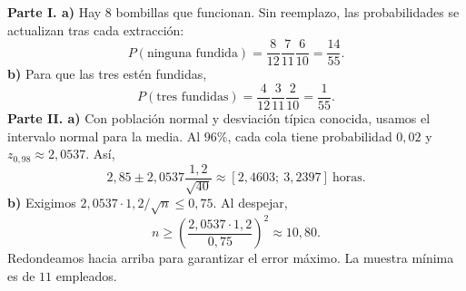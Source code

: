 \textbf{Parte I. a)} Hay 8 bombillas que funcionan. Sin reemplazo, las probabilidades se actualizan tras cada extracción:
\[
 P(\text{ninguna fundida})=\frac8{12}\frac7{11}\frac6{10}
 =\boxed{\frac{14}{55}}.
\]
\textbf{b)} Para que las tres estén fundidas,
\[
 P(\text{tres fundidas})=\frac4{12}\frac3{11}\frac2{10}
 =\boxed{\frac1{55}}.
\]
\textbf{Parte II. a)} Con población normal y desviación típica conocida, usamos el intervalo normal para la media. Al $96\%$, cada cola tiene probabilidad $0{,}02$ y $z_{0{,}98}\approx2{,}0537$. Así,
\[
 2{,}85\pm2{,}0537\frac{1{,}2}{\sqrt{40}}
 \approx\boxed{[2{,}4603;\ 3{,}2397]}\ \text{horas}.
\]
\textbf{b)} Exigimos $2{,}0537\cdot1{,}2/\sqrt n\le0{,}75$. Al despejar,
\[
 n\ge\left(\frac{2{,}0537\cdot1{,}2}{0{,}75}\right)^2
 \approx10{,}80.
\]
Redondeamos hacia arriba para garantizar el error máximo. La muestra mínima es de $\boxed{11}$ empleados.
